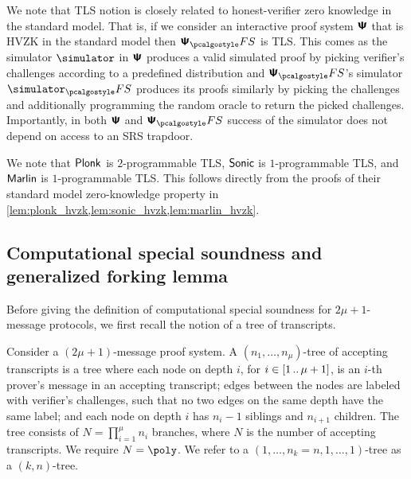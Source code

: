   
\begin{remark}
  We note that TLS notion is closely related to honest-verifier zero knowledge in the
  standard model. That is, if we consider an interactive proof system $\bm{\mathsf{\Psi}}$
  that is HVZK in the standard model then $\proofsystem_\fs$ is TLS. This comes as the simulator $\simulator$ in
  $\bm{\mathsf{\Psi}}$ produces a valid simulated proof by picking verifier's challenges
  according to a predefined distribution and $\proofsystem_\fs$'s simulator
  $\simulator_\fs$ produces its proofs similarly by picking the challenges and
  additionally programming the random oracle to return the picked
  challenges. Importantly, in both $\bm{\mathsf{\Psi}}$ and $\proofsystem_\fs$ success of
  the simulator does not depend on access to an SRS trapdoor.
\end{remark}

We note that $\textnormal{\textsf{Plonk}}$ is $2$-programmable TLS, ${\textnormal{\textsf{Sonic}}}$ is $1$-programmable TLS,
and ${\textnormal{\textsf{Marlin}}}$ is $1$-programmable TLS. This follows directly from the proofs of
their standard model zero-knowledge property in
\cref{lem:plonk_hvzk,lem:sonic_hvzk,lem:marlin_hvzk}. 

\subsection{Computational special soundness and generalized forking lemma}

Before giving the definition of computational special soundness for $2\mu + 1$-message protocols, we first recall the notion of a tree of transcripts.
\begin{definition}
	\label{def:tree_of_accepting_transcripts}
	Consider a $(2\mu + 1)$-message proof system. A $(n_1,
  \ldots, n_\mu)$-tree of accepting transcripts is a tree where each node on
  depth $i$, for $i \in [1 \, .. \, \mu + 1]$, is an $i$-th prover's message in an
  accepting transcript; edges between the nodes are labeled with verifier's
  challenges, such that no two edges on the same depth have the same
  label; and each node on depth $i$ has $n_{i} - 1$ siblings and $n_{i +
    1}$ children. The tree consists of $N = \prod_{i = 1}^\mu n_i$
  branches, where $N$ is the number of accepting transcripts. We require $N = \poly$. We refer to a $(1, \ldots, n_k=n, 1, \ldots, 1)$-tree as a $(k,n)$-tree.
\end{definition}

